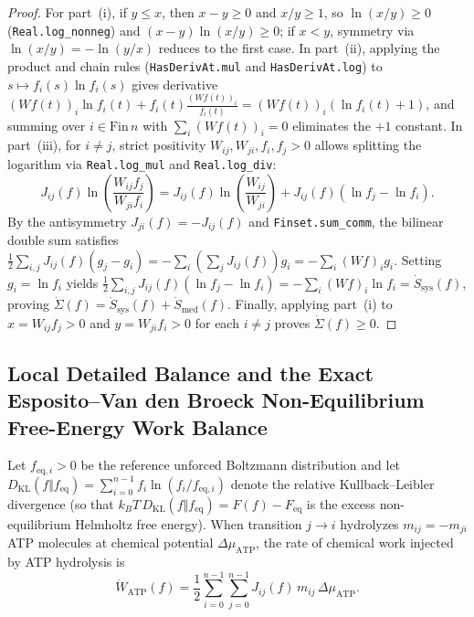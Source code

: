 \documentclass[11pt,a4paper]{article}
\theoremstyle{definition}
\begin{document}
\begin{proof}
For part~(i), if $y \le x$, then $x - y \ge 0$ and $x/y \ge 1$, so $\ln(x/y) \ge 0$ (\texttt{Real.log\_nonneg}) and $(x-y)\ln(x/y) \ge 0$; if $x < y$, symmetry via $\ln(x/y) = -\ln(y/x)$ reduces to the first case. In part~(ii), applying the product and chain rules (\texttt{HasDerivAt.mul} and \texttt{HasDerivAt.log}) to $s \mapsto f_i(s)\ln f_i(s)$ gives derivative $(Wf(t))_i\ln f_i(t) + f_i(t)\frac{(Wf(t))_i}{f_i(t)} = (Wf(t))_i(\ln f_i(t) + 1)$, and summing over $i \in \mathrm{Fin}\,n$ with $\sum_i (Wf(t))_i = 0$ eliminates the $+1$ constant. In part~(iii), for $i \ne j$, strict positivity $W_{ij}, W_{ji}, f_i, f_j > 0$ allows splitting the logarithm via \texttt{Real.log\_mul} and \texttt{Real.log\_div}:
\[
  J_{ij}(f)\ln\!\left(\frac{W_{ij}f_j}{W_{ji}f_i}\right) = J_{ij}(f)\ln\!\left(\frac{W_{ij}}{W_{ji}}\right) + J_{ij}(f)\left(\ln f_j - \ln f_i\right).
\]
By the antisymmetry $J_{ji}(f) = -J_{ij}(f)$ and \texttt{Finset.sum\_comm}, the bilinear double sum satisfies $\frac{1}{2}\sum_{i,j} J_{ij}(f)(g_j - g_i) = -\sum_i \left(\sum_j J_{ij}(f)\right) g_i = -\sum_i (Wf)_i g_i$. Setting $g_i = \ln f_i$ yields $\frac{1}{2}\sum_{i,j} J_{ij}(f)(\ln f_j - \ln f_i) = -\sum_i (Wf)_i \ln f_i = \dot{S}_{\mathrm{sys}}(f)$, proving $\dot{\Sigma}(f) = \dot{S}_{\mathrm{sys}}(f) + \dot{S}_{\mathrm{med}}(f)$. Finally, applying part~(i) to $x = W_{ij}f_j > 0$ and $y = W_{ji}f_i > 0$ for each $i \ne j$ proves $\dot{\Sigma}(f) \ge 0$.
\end{proof}

\subsection{Local Detailed Balance and the Exact Esposito--Van den Broeck Non-Equilibrium Free-Energy Work Balance}

Let $f_{\mathrm{eq},i} > 0$ be the reference unforced Boltzmann distribution and let $D_{\mathrm{KL}}(f \Vert f_{\mathrm{eq}}) = \sum_{i=0}^{n-1} f_i \ln(f_i / f_{\mathrm{eq},i})$ denote the relative Kullback--Leibler divergence (so that $k_B T\,D_{\mathrm{KL}}(f \Vert f_{\mathrm{eq}}) = F(f) - F_{\mathrm{eq}}$ is the excess non-equilibrium Helmholtz free energy). When transition $j \to i$ hydrolyzes $m_{ij} = -m_{ji}$ ATP molecules at chemical potential $\Delta\mu_{\mathrm{ATP}}$, the rate of chemical work injected by ATP hydrolysis is
\begin{equation}
  \dot{W}_{\mathrm{ATP}}(f) = \frac{1}{2}\sum_{i=0}^{n-1}\sum_{j=0}^{n-1} J_{ij}(f)\,m_{ij}\,\Delta\mu_{\mathrm{ATP}}.
\end{equation}
\end{document}

